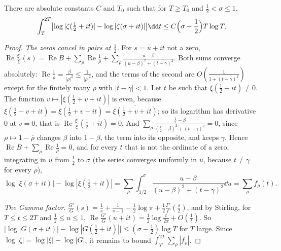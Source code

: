 \begin{proposition}\label{prop:offline}
There are absolute constants $C$ and $T_0$ such that for $T\ge T_0$ and $\frac12<\sigma\le1$,
\[
\int_T^{2T}\bigl|\log|\zeta(\tfrac12+it)|-\log|\zeta(\sigma+it)|\bigr|\dd t\le C\Bigl(\sigma-\frac12\Bigr)T\log T.
\]
\end{proposition}
\begin{proof}
\emph{The zeros cancel in pairs at $\frac12$.} For $s=u+it$ not a zero, $\operatorname{Re}\frac{\xi'}\xi(s)=\operatorname{Re}B+\sum_\rho\operatorname{Re}\frac1\rho+\sum_\rho\frac{u-\beta}{(u-\beta)^2+(t-\gamma)^2}$. Both sums converge absolutely: $\operatorname{Re}\frac1\rho=\frac\beta{|\rho|^2}\le\frac1{|\rho|^2}$, and the terms of the second are $O(\frac1{1+(t-\gamma)^2})$ except for the finitely many $\rho$ with $|t-\gamma|<1$. Let $t$ be such that $\xi(\frac12+it)\ne0$. The function $v\mapsto|\xi(\frac12+v+it)|$ is even, because $\xi(\frac12-v+it)=\xi(\frac12+v-it)=\overline{\xi(\frac12+v+it)}$; so its logarithm has derivative $0$ at $v=0$, that is $\operatorname{Re}\frac{\xi'}\xi(\frac12+it)=0$. And $\sum_\rho\frac{\frac12-\beta}{(\frac12-\beta)^2+(t-\gamma)^2}=0$, since $\rho\mapsto1-\overline\rho$ changes $\beta$ into $1-\beta$, the term into its opposite, and keeps $\gamma$. Hence $\operatorname{Re}B+\sum_\rho\operatorname{Re}\frac1\rho=0$, and for every $t$ that is not the ordinate of a zero, integrating in $u$ from $\frac12$ to $\sigma$ (the series converges uniformly in $u$, because $t\ne\gamma$ for every $\rho$),
\[
\log|\xi(\sigma+it)|-\log|\xi(\tfrac12+it)|=\sum_\rho\int_{1/2}^\sigma\frac{u-\beta}{(u-\beta)^2+(t-\gamma)^2}\dd u=\sum_\rho f_\rho(t).
\]

\emph{The Gamma factor.} $\frac{G'}G(s)=\frac1s+\frac1{s-1}-\frac12\log\pi+\frac12\frac{\Gamma'}\Gamma(\frac s2)$, and by Stirling, for $T\le t\le2T$ and $\frac12\le u\le1$, $\operatorname{Re}\frac{G'}G(u+it)=\frac12\log\frac t{2\pi}+O(\frac1t)$. So $\bigl|\log|G(\sigma+it)|-\log|G(\frac12+it)|\bigr|\le(\sigma-\frac12)\log T$ for $T$ large. Since $\log|\zeta|=\log|\xi|-\log|G|$, it remains to bound $\int_T^{2T}\sum_\rho|f_\rho|$.


\end{proof}
